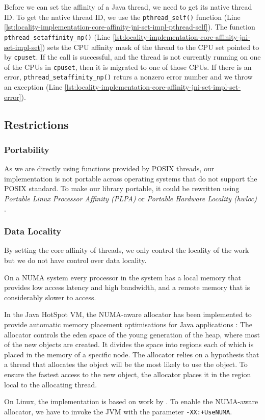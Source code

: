 Before we can set the affinity of a Java thread, we need to get its
native thread ID. To get the native thread ID, we use the
\lstinline!pthread_self()! function (Line
\ref{lst:locality-implementation-core-affinity-jni-set-impl-pthread-self}). The
function \lstinline!pthread_setaffinity_np()! (Line
\ref{lst:locality-implementation-core-affinity-jni-set-impl-set}) sets
the CPU affinity mask of the thread to the CPU set pointed to by
\lstinline!cpuset!.  If the call is successful, and the thread is not
currently running on one of the CPUs in \lstinline!cpuset!, then it is
migrated to one of those CPUs. If there is an error,
\lstinline!pthread_setaffinity_np()!  returs a nonzero error number
and we throw an exception (Line
\ref{lst:locality-implementation-core-affinity-jni-set-impl-set-error}).

\subsection{Restrictions}
\label{sec:locality-implementation-core-affinity-restrictions}

\subsubsection{Portability}

As we are directly using functions provided by POSIX threads, our
implementation is not portable across operating systems that do not
support the POSIX standard. To make our library portable, it could be
rewritten using \emph{Portable Linux Processor Affinity (PLPA)}
\cite{OpenMPI2010a} or \emph{Portable Hardware Locality (hwloc)}
\cite{OpenMPI2010}.

\subsubsection{Data Locality}

By setting the core affinity of threads, we only control the locality
of the work but we do not have control over data locality.

On a NUMA system every processor in the system has a local memory that
provides low access latency and high bandwidth, and a remote memory
that is considerably slower to access.

In the Java HotSpot VM, the NUMA-aware allocator has been implemented
to provide automatic memory placement optimisations for Java
applications \cite{Masamitsu2008, Oracle2010, Humble2010}: The
allocator controls the eden space of the young generation of the heap,
where most of the new objects are created. It divides the space into
regions each of which is placed in the memory of a specific node. The
allocator relies on a hypothesis that a thread that allocates the
object will be the most likely to use the object. To ensure the
fastest access to the new object, the allocator places it in the
region local to the allocating thread.

On Linux, the implementation is based on work by
\textcite{Kleen2004}. To enable the NUMA-aware allocator, we have to
invoke the JVM with the parameter \verb!-XX:+UseNUMA!.


